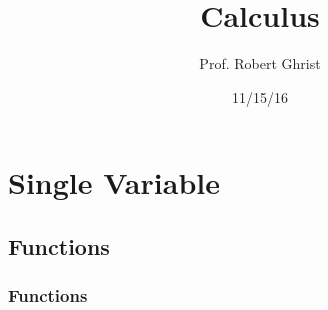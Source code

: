 \documentclass[twoside,openright,titlepage,a4paper]{book}
\title{Calculus}
\author{Prof. Robert Ghrist}
\date{11/15/16}
\begin{document}
\boldmath
\maketitle

\tableofcontents{}

\begin{sloppypar}
\part{Single Variable}

\chapter{Functions} \label{ChFunctions}

\section{Functions} \label{ChFunctionsSecFunctions}


\end{sloppypar}
\end{document}
